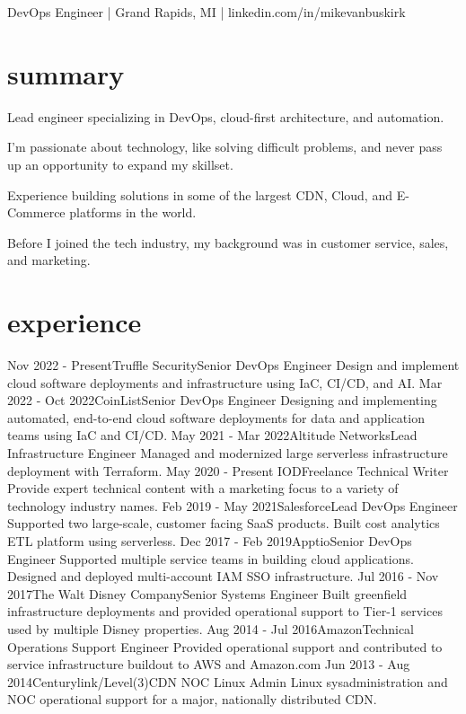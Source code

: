 \documentclass[]{mv_cv}
\begin{document}
       {DevOps Engineer | Grand Rapids, MI | linkedin.com/in/mikevanbuskirk}
 
\section{summary}
\begin{content}
{
Lead engineer specializing in DevOps, cloud-first architecture, and automation.

I'm passionate about technology, like solving difficult problems, and never pass up an opportunity to expand my skillset.

Experience building solutions in some of the largest CDN, Cloud, and E-Commerce platforms in the world.

Before I joined the tech industry, my background was in customer service, sales, and marketing.
}
\end{content}

\section{experience}
  \begin{explist}
    \expitem
    {Nov 2022 - Present}{Truffle Security}{Senior DevOps Engineer}
    {Design and implement cloud software deployments and infrastructure using IaC, CI/CD, and AI.}
    \expitem
    {Mar 2022 - Oct 2022}{CoinList}{Senior DevOps Engineer}
    {Designing and implementing automated, end-to-end cloud software deployments for data and application teams using IaC and CI/CD.}
    \expitem
    {May 2021 - Mar 2022}{Altitude Networks}{Lead Infrastructure Engineer}
    {Managed and modernized large serverless infrastructure deployment with Terraform.}
    \expitem
    {May 2020 - Present  }{IOD}{Freelance Technical Writer}
    {Provide expert technical content with a marketing focus to a variety of technology industry names.}
    \expitem
    {Feb 2019 - May 2021}{Salesforce}{Lead DevOps Engineer}
    {Supported two large-scale, customer facing SaaS products. Built cost analytics ETL platform using serverless.}
    \expitem
    {Dec 2017 - Feb 2019}{Apptio}{Senior DevOps Engineer}
    {Supported multiple service teams in building cloud applications. Designed and deployed multi-account IAM SSO infrastructure.}
    \expitem
    {Jul 2016 - Nov 2017}{The Walt Disney Company}{Senior Systems Engineer}
    {Built greenfield infrastructure deployments and provided operational support to Tier-1 services used by multiple Disney properties.}
    \expitem
    {Aug 2014 - Jul 2016}{Amazon}{Technical Operations Support Engineer}
    {Provided operational support and contributed to service infrastructure buildout to AWS and Amazon.com}
   \expitem
    {Jun 2013 - Aug 2014}{Centurylink/Level(3)}{CDN NOC Linux Admin}
    {Linux sysadministration and NOC operational support for a major, nationally distributed CDN.}
  \end{explist}
\end{document}
